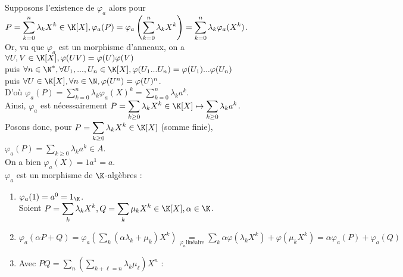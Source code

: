 \documentclass[12pt, a4paper]{report}
\begin{document}
\begin{demo}{}
Supposons l'existence de $\varphi_a$ alors pour $P = \displaystyle{\sum_{k=0}^n \lambda_kX^k} \in \K[X], \\
\varphi_a(P) = \varphi_a \left(\displaystyle{\sum_{k=0}^{n} \lambda_k X^k}\right)= \displaystyle{\sum_{k=0}^n \lambda_k \varphi_a(X^k)}$. \\

Or, vu que $\varphi_a$ est un morphisme d'anneaux, on a $\forall U,V \in \K[X], \varphi(UV) = \varphi(U) \varphi(V)$ \\
puis $\forall n \in \N^*, \forall U_1,...,U_n \in \K[X], \varphi(U_1...U_n) = \varphi(U_1)...\varphi(U_n)$ \\
puis $\forall U \in \K[X], \forall n \in \N, \varphi(U^n) = \varphi(U)^n$. \\

D'où $\varphi_a(P) = \displaystyle{\sum_{k=0}^n \lambda_k \varphi_a(X)^k = \sum_{k=0}^n \lambda_ka^k}$. \\
Ainsi, $\varphi_a$ est nécessairement $P = \displaystyle{\sum_{k \ge 0} \lambda_k X^k \in \K[X] \mapsto \sum_{k \ge 0} \lambda_k a^k}$. \\

Posons donc, pour $P = \displaystyle{\sum_{k \ge 0}\lambda_kX^k} \in \K[X]$ (somme finie), $\varphi_a(P) = \displaystyle{\sum_{k \ge 0} \lambda_ka^k} \in A$. \\

On a bien $\varphi_a(X) = 1a^1 = a$. \\
$\varphi_a$ est un morphisme de $\K$-algèbres :
\begin{enumerate}
	\item $\varphi_a(1) = a^0 = 1_\K$. \\
	Soient $P = \displaystyle{\sum_k \lambda_kX^k, Q = \sum_k \mu_kX^k} \in \K[X], \alpha \in \K$.
	
	\item $\varphi_a (\alpha P + Q) = \varphi_a \left(\displaystyle{\sum_k (\alpha \lambda_k +\mu_k)X^k}\right) \underset{\varphi_a \text{linéaire}}{=}\displaystyle{\sum_k \alpha \varphi(\lambda_k X^k) + \varphi(\mu_kX^k)} = \alpha \varphi_a(P) + \varphi_a(Q)$
	
	\item Avec $PQ = \displaystyle{\sum_n\left(\sum_{k+\ell = n} \lambda_k \mu_\ell\right)X^n}$ : \\
	

\end{enumerate}
\end{demo}
\end{document}

